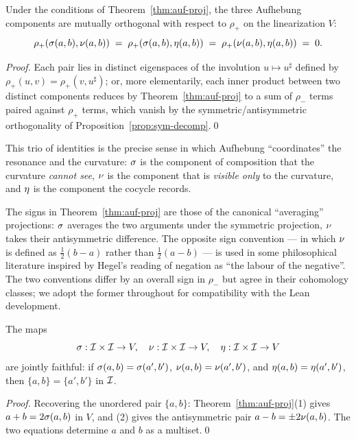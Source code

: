 \begin{corollary}\label{cor:aufhebung-orthogonality}
Under the conditions of Theorem~\ref{thm:auf-proj}, the three Aufhebung
components are mutually orthogonal with respect to $\rho_+$ on the
linearization $V$:
\[
\rho_+(\sigma(a,b),\nu(a,b))
\;=\; \rho_+(\sigma(a,b),\eta(a,b))
\;=\; \rho_+(\nu(a,b),\eta(a,b))\;=\;0.
\]
\end{corollary}

\begin{proof}
Each pair lies in distinct eigenspaces of the involution $u\mapsto u^\sharp$
defined by $\rho_+(u,v)=\rho_+(v,u^\sharp)$; or, more elementarily, each
inner product between two distinct components reduces by
Theorem~\ref{thm:auf-proj} to a sum of $\rho_-$ terms paired against $\rho_+$
terms, which vanish by the symmetric/antisymmetric orthogonality of
Proposition~\ref{prop:sym-decomp}.\qed
\end{proof}

This trio of identities is the precise sense in which Aufhebung
``coordinates'' the resonance and the curvature: $\sigma$ is the
component of composition that the curvature \emph{cannot see}, $\nu$
is the component that is \emph{visible only} to the curvature, and
$\eta$ is the component the cocycle records.

\begin{remark}
The signs in Theorem~\ref{thm:auf-proj} are those of the canonical
``averaging'' projections: $\sigma$ averages the two arguments under
the symmetric projection, $\nu$ takes their antisymmetric difference.
The opposite sign convention --- in which $\nu$ is defined as
$\tfrac12(b-a)$ rather than $\tfrac12(a-b)$ --- is used in some
philosophical literature inspired by Hegel's reading of negation as
``the labour of the negative''. The two conventions differ by an overall
sign in $\rho_-$ but agree in their cohomology classes; we adopt the
former throughout for compatibility with the Lean development.
\end{remark}

\begin{proposition}\label{prop:auf-faithful}
The maps
\[
\sigma:\mathcal{I}\times\mathcal{I}\to V,\quad
\nu:\mathcal{I}\times\mathcal{I}\to V,\quad
\eta:\mathcal{I}\times\mathcal{I}\to V
\]
are jointly faithful: if $\sigma(a,b)=\sigma(a',b')$,
$\nu(a,b)=\nu(a',b')$, and $\eta(a,b)=\eta(a',b')$, then
$\{a,b\}=\{a',b'\}$ in $\mathcal{I}$.
\end{proposition}
\begin{proof}
Recovering the unordered pair $\{a,b\}$: Theorem~\ref{thm:auf-proj}(1)
gives $a+b=2\sigma(a,b)$ in $V$, and (2) gives the antisymmetric pair
$a-b=\pm 2\nu(a,b)$. The two equations determine $a$ and $b$ as a
multiset.\qed
\end{proof}

